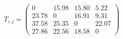 \documentclass[12pt]{article}
\begin{document}
$ \begin{equation*}T_{i,j} = \begin{pmatrix}0 &15.98 & 15.80& 5.22\\ 23.78 & 0 &16.91 & 9.31 \\ 37.58 & 25.35 & 0 & 22.07 \\ 27.86 & 22.56 & 18.58 & 0\end{pmatrix}\end{equation*} $
\end{document}
